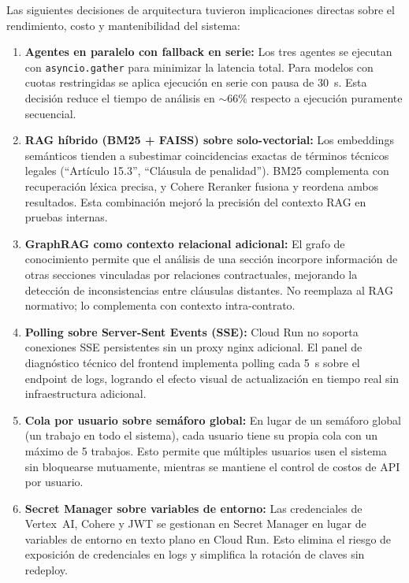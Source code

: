 Las siguientes decisiones de arquitectura tuvieron implicaciones directas
sobre el rendimiento, costo y mantenibilidad del sistema:

\begin{enumerate}
    \item \textbf{Agentes en paralelo con fallback en serie:}
    Los tres agentes se ejecutan con \texttt{asyncio.gather} para minimizar
    la latencia total. Para modelos con cuotas restringidas se aplica
    ejecución en serie con pausa de 30~s. Esta decisión reduce el tiempo
    de análisis en $\sim$66\% respecto a ejecución puramente secuencial.

    \item \textbf{RAG híbrido (BM25 + FAISS) sobre solo-vectorial:}
    Los embeddings semánticos tienden a subestimar coincidencias exactas de
    términos técnicos legales (``Artículo 15.3'', ``Cláusula de penalidad'').
    BM25 complementa con recuperación léxica precisa, y Cohere Reranker
    fusiona y reordena ambos resultados. Esta combinación mejoró la
    precisión del contexto RAG en pruebas internas.

    \item \textbf{GraphRAG como contexto relacional adicional:}
    El grafo de conocimiento permite que el análisis de una sección incorpore
    información de otras secciones vinculadas por relaciones contractuales,
    mejorando la detección de inconsistencias entre cláusulas distantes.
    No reemplaza al RAG normativo; lo complementa con contexto intra-contrato.

    \item \textbf{Polling sobre Server-Sent Events (SSE):}
    Cloud Run no soporta conexiones SSE persistentes sin un proxy nginx
    adicional. El panel de diagnóstico técnico del frontend implementa
    polling cada 5~s sobre el endpoint de logs, logrando el efecto visual
    de actualización en tiempo real sin infraestructura adicional.

    \item \textbf{Cola por usuario sobre semáforo global:}
    En lugar de un semáforo global (un trabajo en todo el sistema), cada
    usuario tiene su propia cola con un máximo de 5 trabajos. Esto permite
    que múltiples usuarios usen el sistema sin bloquearse mutuamente,
    mientras se mantiene el control de costos de API por usuario.

    \item \textbf{Secret Manager sobre variables de entorno:}
    Las credenciales de Vertex~AI, Cohere y JWT se gestionan en Secret
    Manager en lugar de variables de entorno en texto plano en Cloud Run.
    Esto elimina el riesgo de exposición de credenciales en logs y
    simplifica la rotación de claves sin redeploy.
\end{enumerate}